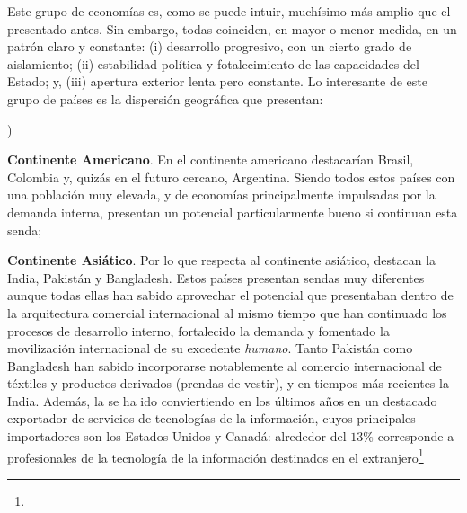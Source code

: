 \documentclass[10pt,a4paper]{article}
\newcounter{alphaitem}
\newenvironment{la}
      {\begin{list}{\alph{alphaitem})}{%
          \usecounter{alphaitem}%
          \setlength{\leftmargin}{1cm}%
          \setlength{\parskip}{3pt}%
          \setlength{\itemsep}{0pt}%
          \setlength{\parsep}{0pt}%
      }}
      {\end{list}}
\begin{document}
Este grupo de economías es, como se puede intuir, muchísimo más amplio que el presentado antes. Sin embargo, todas coinciden, en mayor o menor medida, en un patrón claro y constante: (i) desarrollo progresivo, con un cierto grado de aislamiento; (ii) estabilidad política y fotalecimiento de las capacidades del Estado; y, (iii) apertura exterior lenta pero constante. Lo interesante de este grupo de países es la dispersión geográfica que presentan:
\begin{la}
    \item \textbf{Continente Americano}. En el continente americano destacarían Brasil, Colombia y, quizás en el futuro cercano, Argentina. Siendo todos estos países con una población muy elevada, y de economías principalmente impulsadas por la demanda interna, presentan un potencial particularmente bueno si continuan esta senda;
    \item \textbf{Continente Asiático}. Por lo que respecta al continente asiático, destacan la India, Pakistán y Bangladesh. Estos países presentan sendas muy diferentes aunque todas ellas han sabido aprovechar el potencial que presentaban dentro de la arquitectura comercial internacional al mismo tiempo que han continuado los procesos de desarrollo interno, fortalecido la demanda y fomentado la movilización internacional de su excedente \textit{humano}. Tanto Pakistán como Bangladesh han sabido incorporarse notablemente al comercio internacional de téxtiles y productos derivados (prendas de vestir), y en tiempos más recientes la India. Además, la se ha ido conviertiendo en los últimos años en un destacado exportador de servicios de tecnologías de la información, cuyos principales importadores son los Estados Unidos y Canadá: alrededor del $13\%$ corresponde a profesionales de la tecnología de la información destinados en el extranjero\footnote{%
}
\end{la}
\end{document}

